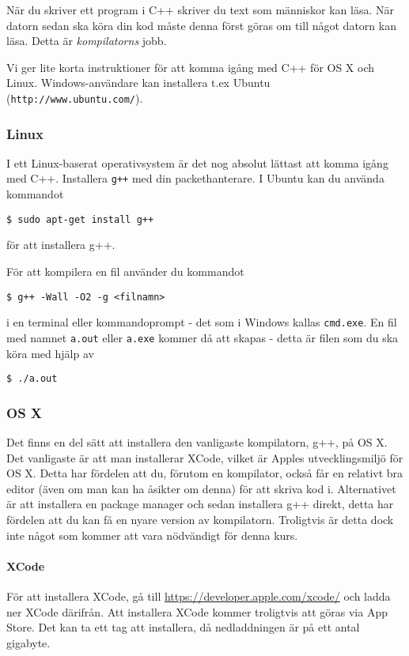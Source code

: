 När du skriver ett program i C++ skriver du text som människor kan läsa. När datorn sedan ska köra din kod måste denna först göras om till något datorn kan läsa. Detta är \emph{kompilatorns} jobb.

Vi ger lite korta instruktioner för att komma igång med C++ för OS X och Linux. Windows-användare kan installera t.ex Ubuntu (\texttt{http://www.ubuntu.com/}).

\subsubsection{Linux}
I ett Linux-baserat operativsystem är det nog absolut lättast att komma igång med C++. Installera \texttt{g++} med din packethanterare. I Ubuntu kan du använda kommandot

\texttt{\$ sudo apt-get install g++}

för att installera g++.

För att kompilera en fil använder du kommandot

\texttt{\$ g++ -Wall -O2 -g <filnamn>}

i en terminal eller kommandoprompt - det som i Windows kallas \texttt{cmd.exe}. En fil med namnet \texttt{a.out} eller \texttt{a.exe} kommer då att skapas - detta är filen som du ska köra med hjälp av

\texttt{\$ ./a.out}


\subsubsection{OS X}

Det finns en del sätt att installera den vanligaste kompilatorn, g++, på OS X. Det vanligaste är att man installerar XCode, vilket är Apples utvecklingsmiljö för OS X. Detta har fördelen att du, förutom en kompilator, också får en relativt bra editor (även om man kan ha åsikter om denna) för att skriva kod i. Alternativet är att installera en package manager och sedan installera g++ direkt, detta har fördelen att du kan få en nyare version av kompilatorn. Troligtvis är detta dock inte något som kommer att vara nödvändigt för denna kurs.

\paragraph{XCode}
För att installera XCode, gå till \url{https://developer.apple.com/xcode/} och ladda ner XCode därifrån. Att installera XCode kommer troligtvis att göras via App Store. Det kan ta ett tag att installera, då nedladdningen är på ett antal gigabyte.

